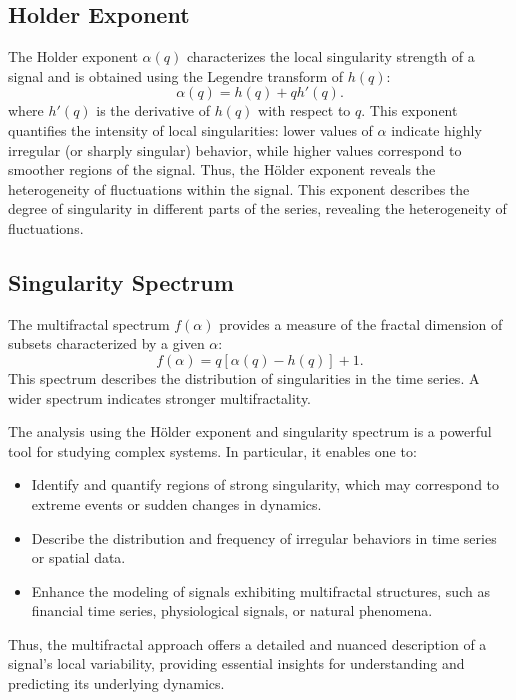 \documentclass[11pt]{extarticle}
\begin{document}
\subsection{Holder Exponent}
The Holder exponent $\alpha(q)$ characterizes the local singularity strength of a signal and is obtained using the Legendre transform of $h(q)$:
\begin{equation}
\alpha(q) = h(q) + q h'(q).
\end{equation}
where $h'(q)$ is the derivative of $h(q)$ with respect to $q$. This exponent quantifies the intensity of local singularities: lower values of $\alpha$ indicate highly irregular (or sharply singular) behavior, while higher values correspond to smoother regions of the signal. Thus, the Hölder exponent reveals the heterogeneity of fluctuations within the signal.
This exponent describes the degree of singularity in different parts of the series, revealing the heterogeneity of fluctuations.

\subsection{Singularity Spectrum}
The multifractal spectrum $f(\alpha)$ provides a measure of the fractal dimension of subsets characterized by a given $\alpha$:
\begin{equation}
f(\alpha) = q [\alpha(q) - h(q)] + 1.
\end{equation}
This spectrum describes the distribution of singularities in the time series. A wider spectrum indicates stronger multifractality.

The analysis using the Hölder exponent and singularity spectrum is a powerful tool for studying complex systems. In particular, it enables one to:
\begin{itemize}
    \item Identify and quantify regions of strong singularity, which may correspond to extreme events or sudden changes in dynamics.
    \item Describe the distribution and frequency of irregular behaviors in time series or spatial data.
    \item Enhance the modeling of signals exhibiting multifractal structures, such as financial time series, physiological signals, or natural phenomena.
\end{itemize}
Thus, the multifractal approach offers a detailed and nuanced description of a signal's local variability, providing essential insights for understanding and predicting its underlying dynamics. \\
\end{document}
